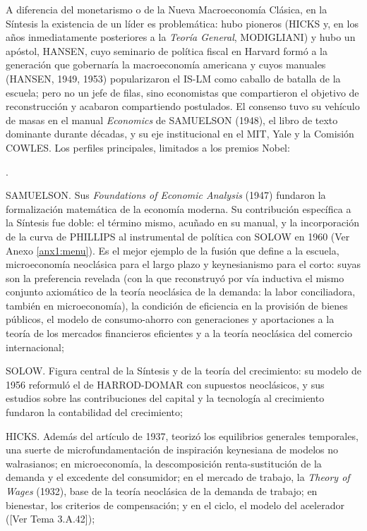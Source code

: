 \documentclass[10pt,a4paper]{article}
\newcounter{numitem}
\newenvironment{lnum}
      {\begin{list}{\arabic{numitem}.}{%
          \usecounter{numitem}%
          \setlength{\leftmargin}{1cm}%
          \setlength{\parskip}{3pt}%
          \setlength{\itemsep}{0pt}%
          \setlength{\parsep}{0pt}%
      }}
      {\end{list}}
\newcommand{\authorfont}[1]{{\fontfamily{EBGaramond-TLF}\selectfont #1}}
\begin{document}
A diferencia del monetarismo o de la Nueva Macroeconomía Clásica, en la Síntesis la existencia de un líder es problemática: hubo pioneros (HICKS y, en los años inmediatamente posteriores a la \textit{Teoría General}, MODIGLIANI) y hubo un apóstol, HANSEN, cuyo seminario de política fiscal en Harvard formó a la generación que gobernaría la macroeconomía americana y cuyos manuales (HANSEN, 1949, 1953) popularizaron el IS-LM como caballo de batalla de la escuela; pero no un jefe de filas, sino economistas que compartieron el objetivo de reconstrucción y acabaron compartiendo postulados. El consenso tuvo su vehículo de masas en el manual \textit{Economics} de SAMUELSON (1948), el libro de texto dominante durante décadas, y su eje institucional en el MIT, Yale y la Comisión COWLES. Los perfiles principales, limitados a los premios Nobel:
\begin{lnum}
    \item SAMUELSON. Sus \textit{Foundations of Economic Analysis} (1947) fundaron la formalización matemática de la economía moderna. Su contribución específica a la Síntesis fue doble: el término mismo, acuñado en su manual, y la incorporación de la curva de PHILLIPS al instrumental de política con SOLOW en 1960 (Ver Anexo \ref{anx1:menu}). Es el mejor ejemplo de la fusión que define a la escuela, microeconomía neoclásica para el largo plazo y keynesianismo para el corto: suyas son la preferencia revelada (con la que reconstruyó por vía inductiva el mismo conjunto axiomático de la teoría neoclásica de la demanda: la labor conciliadora, también en microeconomía), la condición de eficiencia en la provisión de bienes públicos, el modelo de consumo-ahorro con generaciones y aportaciones a la teoría de los mercados financieros eficientes y a la teoría neoclásica del comercio internacional;
    \item SOLOW. Figura central de la Síntesis y de la teoría del crecimiento: su modelo de 1956 reformuló el de HARROD-DOMAR con supuestos neoclásicos, y sus estudios sobre las contribuciones del capital y la tecnología al crecimiento fundaron la contabilidad del crecimiento;
    \item HICKS. Además del artículo de 1937, teorizó los equilibrios generales temporales, una suerte de microfundamentación de inspiración keynesiana de modelos no walrasianos; en microeconomía, la descomposición renta-sustitución de la demanda y el excedente del consumidor; en el mercado de trabajo, la \textit{Theory of Wages} (1932), base de la teoría neoclásica de la demanda de trabajo; en bienestar, los criterios de compensación; y en el ciclo, el modelo del acelerador ([\authorfont{Ver Tema 3.A.42}]);

\end{lnum}
\end{document}
